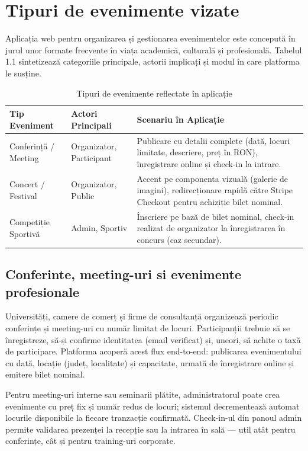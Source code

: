 \section{Tipuri de evenimente vizate}

Aplicația web pentru organizarea și gestionarea evenimentelor este concepută în jurul unor formate frecvente în viața academică, culturală și profesională. Tabelul 1.1 sintetizează categoriile principale, actorii implicați și modul în care platforma le susține. 

\begin{table}[htbp]
	\centering
	\begin{tabular}{|l|l|p{7.5cm}|}
		\hline
		\textbf{Tip Eveniment} & \textbf{Actori Principali} & \textbf{Scenariu în Aplicație} \\ \hline
		Conferință / Meeting & Organizator, Participant & Publicare cu detalii complete (dată, locuri limitate, descriere, preț în RON), înregistrare online și check-in la intrare. \\ \hline
		Concert / Festival & Organizator, Public & Accent pe componenta vizuală (galerie de imagini), redirecționare rapidă către Stripe Checkout pentru achiziție bilet nominal. \\ \hline
		Competiție Sportivă & Admin, Sportiv & Înscriere pe bază de bilet nominal, check-in realizat de organizator la înregistrarea în concurs (caz secundar). \\ \hline
	\end{tabular}
	\caption{Tipuri de evenimente reflectate în aplicație}
	\label{tab:evenimente}
\end{table}

\subsection{Conferinte, meeting-uri si evenimente profesionale}

Universități, camere de comerț și firme de consultanță organizează periodic conferințe și meeting-uri cu număr limitat de locuri. Participanții trebuie să se înregistreze, să-și confirme identitatea (email verificat) și, uneori, să achite o taxă de participare. Platforma acoperă acest flux end-to-end: publicarea evenimentului cu dată, locație (județ, localitate) și capacitate, urmată de înregistrare online și emitere bilet nominal.

Pentru meeting-uri interne sau seminarii plătite, administratorul poate crea evenimente cu preț fix și număr redus de locuri; sistemul decrementează automat locurile disponibile la fiecare tranzacție confirmată. Check-in-ul din panoul admin permite validarea prezenței la recepție sau la intrarea în sală — util atât pentru conferințe, cât și pentru training-uri corporate.

